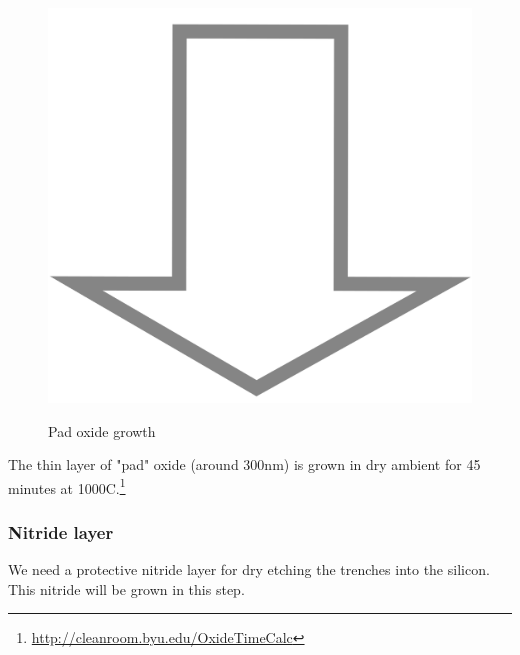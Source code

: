 \begin{figure}[H]
	\centering
	\begin{tikzpicture}[node distance = 3cm, auto, thick,scale=\CrossSectionOnly, every node/.style={transform shape}]
		
	\end{tikzpicture} \\
	\includegraphics[scale=0.01]{down_arrow.png} \\
	\begin{tikzpicture}[node distance = 3cm, auto, thick,scale=\CrossSectionOnly, every node/.style={transform shape}]
		
	\end{tikzpicture}
	\caption{Pad oxide growth}
\end{figure}

The thin layer of "pad" oxide (around 300nm) is grown in dry ambient for 45 minutes at 1000\degree C.\footnote{\url{http://cleanroom.byu.edu/OxideTimeCalc}}

\subsubsection{Nitride layer}

We need a protective nitride layer for dry etching the trenches into the silicon. This nitride will be grown in this step.

